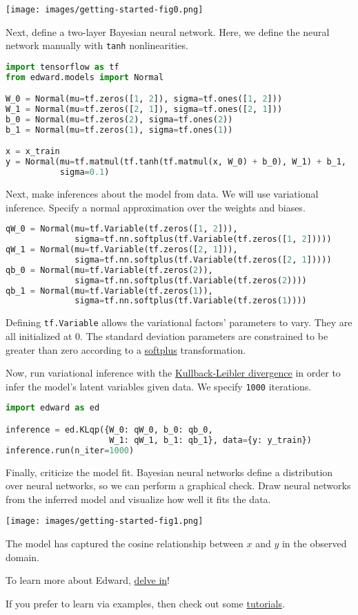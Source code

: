 \texttt{[image: images/getting-started-fig0.png]}

Next, define a two-layer Bayesian neural network. Here, we
define the neural network manually with \texttt{tanh} nonlinearities.

\begin{lstlisting}[language=Python]
import tensorflow as tf
from edward.models import Normal

W_0 = Normal(mu=tf.zeros([1, 2]), sigma=tf.ones([1, 2]))
W_1 = Normal(mu=tf.zeros([2, 1]), sigma=tf.ones([2, 1]))
b_0 = Normal(mu=tf.zeros(2), sigma=tf.ones(2))
b_1 = Normal(mu=tf.zeros(1), sigma=tf.ones(1))

x = x_train
y = Normal(mu=tf.matmul(tf.tanh(tf.matmul(x, W_0) + b_0), W_1) + b_1,
           sigma=0.1)
\end{lstlisting}

Next, make inferences about the model from data. We will use variational
inference. Specify a normal approximation over the weights and biases.

\begin{lstlisting}[language=Python]
qW_0 = Normal(mu=tf.Variable(tf.zeros([1, 2])),
              sigma=tf.nn.softplus(tf.Variable(tf.zeros([1, 2]))))
qW_1 = Normal(mu=tf.Variable(tf.zeros([2, 1])),
              sigma=tf.nn.softplus(tf.Variable(tf.zeros([2, 1]))))
qb_0 = Normal(mu=tf.Variable(tf.zeros(2)),
              sigma=tf.nn.softplus(tf.Variable(tf.zeros(2))))
qb_1 = Normal(mu=tf.Variable(tf.zeros(1)),
              sigma=tf.nn.softplus(tf.Variable(tf.zeros(1))))
\end{lstlisting}

Defining \texttt{tf.Variable} allows the variational factors'
parameters to vary. They are all initialized at 0. The standard
deviation parameters are constrained to be greater than zero according
to a
\href{https://en.wikipedia.org/wiki/Rectifier_(neural_networks)}{softplus}
transformation.

Now, run variational inference with the
\href{https://en.wikipedia.org/wiki/Kullback–Leibler_divergence}{Kullback-Leibler divergence}
in order to infer the model's latent variables given data.
We specify \texttt{1000} iterations.

\begin{lstlisting}[language=Python]
import edward as ed

inference = ed.KLqp({W_0: qW_0, b_0: qb_0,
                     W_1: qW_1, b_1: qb_1}, data={y: y_train})
inference.run(n_iter=1000)
\end{lstlisting}

Finally, criticize the model fit. Bayesian neural networks define a distribution
over neural networks, so we can perform a graphical check. Draw neural networks
from the inferred model and visualize how well it fits the data.

\texttt{[image: images/getting-started-fig1.png]}

The model has captured the cosine relationship between $x$ and $y$
in the observed domain.

To learn more about Edward, \href{/api}{delve in}!

If you prefer to learn via examples, then check out some
\href{/tutorials/}{tutorials}.
